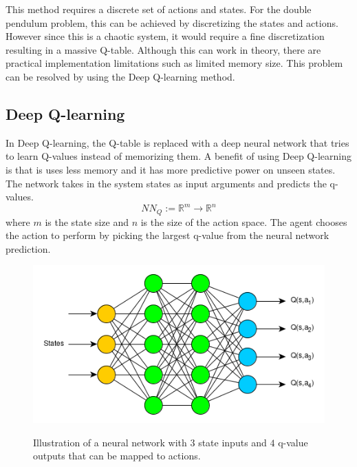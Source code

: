 \documentclass{LTHtwocol} %
\begin{document}
This method requires a discrete set of actions and states. For the double pendulum problem, this can be achieved by discretizing the states and actions.
However since this is a chaotic system, it would require a fine discretization resulting in a massive Q-table. Although this can work in theory, there are practical implementation limitations such as limited memory size.
This problem can be resolved by using the Deep Q-learning method.

\subsection{Deep Q-learning}
In Deep Q-learning, the Q-table is replaced with a deep neural network that tries to learn Q-values instead of memorizing them.
A benefit of using Deep Q-learning is that is uses less memory and it has more predictive power on unseen states.
The network takes in the system states as input arguments and predicts the q-values.
\begin{equation}
	\label{eqn:neural_network_mapping}
	NN_Q := \mathbb{R}^m \to \mathbb{R}^n
\end{equation}
where $m$ is the state size and $n$ is the size of the action space.
The agent chooses the action to perform by picking the largest q-value from the neural network prediction.
\begin{figure}[H]
	\centering
	\includegraphics[width=0.9\columnwidth]{figures/q_network.png}
	\label{fig:q_network_illustration}
	\caption{Illustration of a neural network with $3$ state inputs and $4$ q-value outputs that can be mapped to actions.}
\end{figure}
\end{document}
